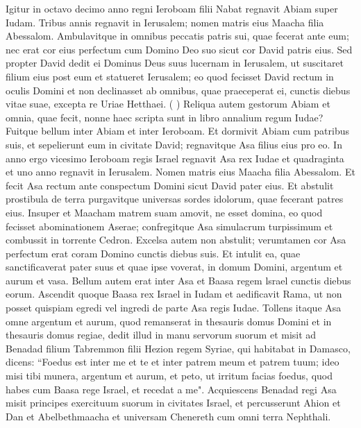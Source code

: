 \begin{biblechapter}  
\verse Igitur in octavo decimo anno regni Ieroboam filii Nabat regnavit Abiam super Iudam. 
\verse Tribus annis regnavit in Ierusalem; nomen matris eius Maacha filia Abessalom. 
\verse Ambulavitque in omnibus peccatis patris sui, quae fecerat ante eum; nec erat cor eius perfectum cum Domino Deo suo sicut cor David patris eius. 
\verse Sed propter David dedit ei Dominus Deus suus lucernam in Ierusalem, ut suscitaret filium eius post eum et statueret Ierusalem; 
\verse eo quod fecisset David rectum in oculis Domini et non declinasset ab omnibus, quae praeceperat ei, cunctis diebus vitae suae, excepta re Uriae Hetthaei. ( 
\verse ) 
\verse Reliqua autem gestorum Abiam et omnia, quae fecit, nonne haec scripta sunt in libro annalium regum Iudae? Fuitque bellum inter Abiam et inter Ieroboam. 
\verse Et dormivit Abiam cum patribus suis, et sepelierunt eum in civitate David; regnavitque Asa filius eius pro eo. 
\verse In anno ergo vicesimo Ieroboam regis Israel regnavit Asa rex Iudae 
\verse et quadraginta et uno anno regnavit in Ierusalem. Nomen matris eius Maacha filia Abessalom. 
\verse Et fecit Asa rectum ante conspectum Domini sicut David pater eius. 
\verse Et abstulit prostibula de terra purgavitque universas sordes idolorum, quae fecerant patres eius. 
\verse Insuper et Maacham matrem suam amovit, ne esset domina, eo quod fecisset abominationem Aserae; confregitque Asa simulacrum turpissimum et combussit in torrente Cedron. 
\verse Excelsa autem non abstulit; verumtamen cor Asa perfectum erat coram Domino cunctis diebus suis. 
\verse Et intulit ea, quae sanctificaverat pater suus et quae ipse voverat, in domum Domini, argentum et aurum et vasa. 
\verse Bellum autem erat inter Asa et Baasa regem lsrael cunctis diebus eorum.  
\verse Ascendit quoque Baasa rex Israel in Iudam et aedificavit Rama, ut non posset quispiam egredi vel ingredi de parte Asa regis Iudae. 
\verse Tollens itaque Asa omne argentum et aurum, quod remanserat in thesauris domus Domini et in thesauris domus regiae, dedit illud in manu servorum suorum et misit ad Benadad filium Tabremmon filii Hezion regem Syriae, qui habitabat in Damasco, dicens:  
\verse “Foedus est inter me et te et inter patrem meum et patrem tuum; ideo misi tibi munera, argentum et aurum, et peto, ut irritum facias foedus, quod habes cum Baasa rege Israel, et recedat a me". 
\verse Acquiescens Benadad regi Asa misit principes exercituum suorum in civitates Israel, et percusserunt Ahion et Dan et Abelbethmaacha et universam Chenereth cum omni terra Nephthali. 

\end{biblechapter}
